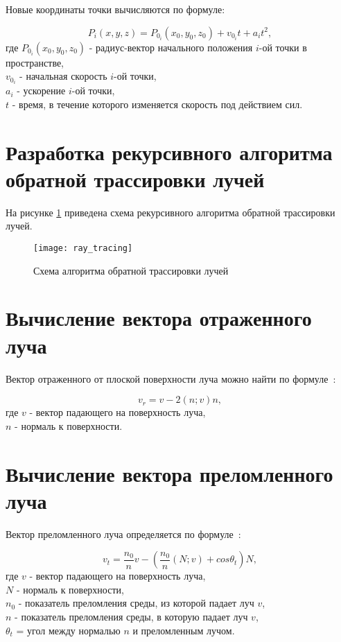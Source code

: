 Новые координаты точки вычисляются по формуле:

\begin{equation}\label{new_pos}
	P_i(x, y, z) = P_{0_i}(x_0, y_0, z_0) + v_{0_i} t + a_i t^2,
\end{equation}
где $P_{0_i}(x_0, y_0, z_0)$ - радиус-вектор начального положения $i$-ой точки в пространстве,\\
\text{~~~~~~}$v_{0_i}$ - начальная скорость $i$-ой точки,\\
\text{~~~~~~}$a_i$ - ускорение $i$-ой точки,\\
\text{~~~~~~}$t$ - время, в течение которого изменяется скорость под действием сил.

\section{Разработка рекурсивного алгоритма обратной трассировки лучей}

На рисунке \ref{ray_tracing} приведена схема рекурсивного алгоритма обратной трассировки лучей.

\begin{figure}[H]
	\centering
	\texttt{[image: ray\_tracing]}
	\caption{Схема алгоритма обратной трассировки лучей}
	\label{ray_tracing}
\end{figure}

\section{Вычисление вектора отраженного луча}

Вектор отраженного от плоской поверхности луча можно найти по формуле~\cite{raytracingen}:

\begin{equation}\label{refl}
	v_r = v - 2(n; v)n,
\end{equation}
где $v$ - вектор падающего на поверхность луча,\\
\text{~~~~~~}$n$ - нормаль к поверхности.

\section{Вычисление вектора преломленного луча}

Вектор преломленного луча определяется по формуле~\cite{raytracingen}:

\begin{equation}\label{refr}
	v_t = \frac{n_0}{n} v - (\frac{n_0}{n}(N; v) + cos\theta_t)N,
\end{equation}
где $v$ - вектор падающего на поверхность луча,\\
\text{~~~~~~}$N$ - нормаль к поверхности,\\
\text{~~~~~~}$n_0$ - показатель преломления среды, из которой падает луч $v$,\\
\text{~~~~~~}$n$ - показатель преломления среды, в которую падает луч $v$,\\
\text{~~~~~~}$\theta_t$ = угол между нормалью $n$ и преломленным лучом.

